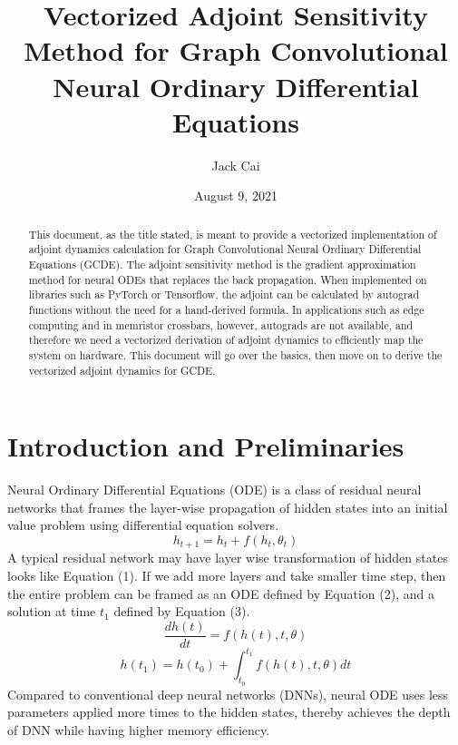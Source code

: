 \documentclass{article}
\title{Vectorized Adjoint Sensitivity Method for Graph Convolutional Neural Ordinary Differential Equations}
\author[1]{Jack Cai}
\affil[1]{University of Toronto, Division of Engineering Science}
\date{August 9, 2021}
\begin{document}
\maketitle

\begin{abstract}
This document, as the title stated, is meant to provide a vectorized implementation of adjoint dynamics calculation for Graph Convolutional Neural Ordinary Differential Equations (GCDE). The adjoint sensitivity method is the gradient approximation method for neural ODEs that replaces the back propagation. When implemented on libraries such as PyTorch or Tensorflow, the adjoint can be calculated by autograd functions without the need for a hand-derived formula. In applications such as edge computing and in memristor crossbars, however, autograds are not available, and therefore we need a vectorized derivation of adjoint dynamics to efficiently map the system on hardware. This document will go over the basics, then move on to derive the vectorized adjoint dynamics for GCDE.
\end{abstract}

\section{Introduction and Preliminaries}

Neural Ordinary Differential Equations (ODE) is a class of residual neural networks that frames the layer-wise propagation of hidden states into an initial value problem using differential equation solvers. 
\begin{equation}
h_{t+1} = h_{t} + f(h_{t}, \theta_{t})
\end{equation}
A typical residual network may have layer wise transformation of hidden states looks like Equation (1). If we add more layers and take smaller time step, then the entire problem can be framed as an ODE defined by Equation (2), and a solution at time $t_{1}$ defined by Equation (3). 
\begin{equation}
\frac{dh(t)}{dt} = f(h(t), t, \theta)
\end{equation}
\begin{equation}
h(t_{1}) = h(t_{0}) + \int_{t_{0}}^{t_{1}} f(h(t), t, \theta)dt
\end{equation}
Compared to conventional deep neural networks (DNNs), neural ODE uses less parameters applied more times to the hidden states, thereby achieves the depth of DNN while having higher memory efficiency. 
\end{document}
